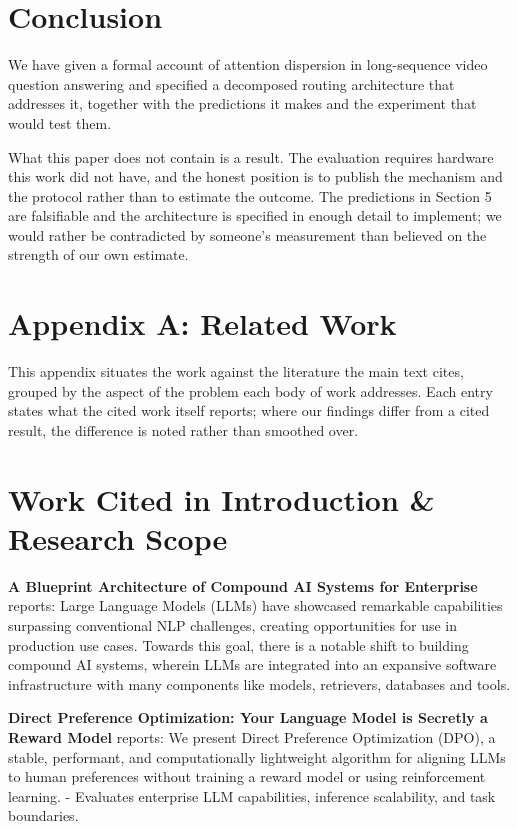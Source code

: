 \documentclass{article}
\begin{document}
\section{Conclusion}


We have given a formal account of attention dispersion in long-sequence video question answering and specified a decomposed routing architecture that addresses it, together with the predictions it makes and the experiment that would test them.

What this paper does not contain is a result. The evaluation requires hardware this work did not have, and the honest position is to publish the mechanism and the protocol rather than to estimate the outcome. The predictions in Section 5 are falsifiable and the architecture is specified in enough detail to implement; we would rather be contradicted by someone's measurement than believed on the strength of our own estimate.




\section{Appendix A: Related Work}


This appendix situates the work against the literature the main text cites, grouped by the aspect of the problem each body of work addresses. Each entry states what the cited work itself reports; where our findings differ from a cited result, the difference is noted rather than smoothed over.


\section{Work Cited in Introduction \& Research Scope}


\textbf{A Blueprint Architecture of Compound AI Systems for Enterprise} \cite{arxiv_2406_00584} reports: Large Language Models (LLMs) have showcased remarkable capabilities surpassing conventional NLP challenges, creating opportunities for use in production use cases. Towards this goal, there is a notable shift to building compound AI systems, wherein LLMs are integrated into an expansive software infrastructure with many components like models, retrievers, databases and tools.

\textbf{Direct Preference Optimization: Your Language Model is Secretly a Reward Model} \cite{arxiv_2305_18290} reports: We present Direct Preference Optimization (DPO), a stable, performant, and computationally lightweight algorithm for aligning LLMs to human preferences without training a reward model or using reinforcement learning. - Evaluates enterprise LLM capabilities, inference scalability, and task boundaries.
\end{document}
